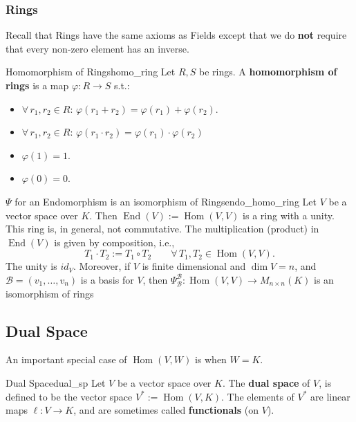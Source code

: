 \subsubsection{Rings}
Recall that Rings have the same axioms as Fields except that we do \textbf{not} require that every non-zero element has an inverse.

\begin{definition}{Homomorphism of Rings}{homo_ring}
	Let $R, S$ be rings. A \textbf{homomorphism of rings} is a map $\varphi: R \to S$ s.t.:
	\begin{itemize}
		\item[$\bullet$] $\forall \, r_1,r_2 \in R : \, \varphi(r_1 + r_2) = \varphi(r_1) + \varphi(r_2)$.
		\item[$\bullet$] $\forall \, r_1,r_2 \in R: \, \varphi(r_1 \cdot r_2) = \varphi(r_1) \cdot \varphi(r_2)$
		\item[$\bullet$] $\varphi(1) = 1$.
		\item[$\bullet$] $\varphi(0) = 0$.
	\end{itemize}
\end{definition}

\begin{corollary}{$\Psi$ for an Endomorphism is an isomorphism of Rings}{endo_homo_ring}
	Let $V$ be a vector space over $K$. Then $\operatorname{End}(V) := \operatorname{Hom}(V, V)$ is a ring with a unity. This ring is, in general, not commutative. The multiplication (product) in $\operatorname{End}(V)$ is given by composition, i.e.,
	\[
		T_1 \cdot T_2 := T_1 \circ T_2 \qquad \forall \, T_1, T_2 \in \operatorname{Hom}(V,V).
	\]
	The unity is $id_V$. Moreover, if $V$ is finite dimensional and $\dim V = n$, and $\mathcal{B} = (v_1, \hdots , v_n)$ is a basis for $V$, then $\Psi^{\mathcal{B}}_{\mathcal{B}}: \operatorname{Hom}(V,V) \to M_{n \times n}(K)$ is an isomorphism of rings
\end{corollary}

\subsection{Dual Space}
An important special case of $\operatorname{Hom}(V,W)$ is when $W = K$.

\begin{definition}{Dual Space}{dual_sp}
	Let $V$ be a vector space over $K$. The \textbf{dual space} of $V$, is defined to be the vector space $V^* := \operatorname{Hom}(V,K)$. The elements of $V^*$ are linear maps $\ell :V \to K$, and are sometimes called \textbf{functionals} (on $V$).
\end{definition}

